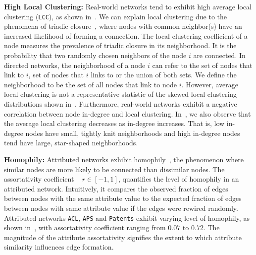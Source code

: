 \textbf{High Local Clustering:} Real-world networks tend to exhibit high average local clustering (\texttt{LCC}), as shown in~. We can explain local clustering due to the phenomena of triadic closure~\cite{simmel1950sociology,
newman2001clustering}, where nodes with common neighbor(s) have an increased
likelihood of forming a connection.
The local clustering coefficient of a node measures the prevalence of triadic closure in its neighborhood. It is the probability that two randomly chosen neighbors of the node $i$ are connected. In directed networks, the neighborhood of a node $i$ can refer to the
set of nodes that link to $i$, set of nodes that $i$ links to or the union of
both sets. We define the neighborhood to be the set of all nodes that link to
node $i$.  However, average local clustering is not a
representative statistic of the {skewed} local clustering distributions
shown in~. Furthermore, real-world networks exhibit a negative
correlation between node in-degree  and local clustering. In~, we
also observe that the average local clustering  decreases as in-degree increases.
That is, low in-degree nodes have small, tightly knit neighborhoods and high
in-degree nodes tend have large, star-shaped neighborhoods.



\textbf{Homophily:}
Attributed networks exhibit homophily~\cite{mcpherson2001birds}, the phenomenon where similar nodes are more likely
to be connected than dissimilar nodes. The assortativity coefficient
~\cite{newman2002assortative} $r \in [-1, 1]$,
quantifies the level of homophily in an attributed network. Intuitively, it
compares the observed fraction of edges between nodes with the same attribute
value to the expected fraction of edges between nodes with same attribute value
if the edges were rewired randomly.
Attributed networks \texttt{ACL}, \texttt{APS} and \texttt{Patents} exhibit
varying level of homophily, as shown in~, with assortativity
coefficient ranging from $0.07$ to $0.72$.
The magnitude of the attribute assortativity
signifies the extent to which attribute similarity influences edge formation.

